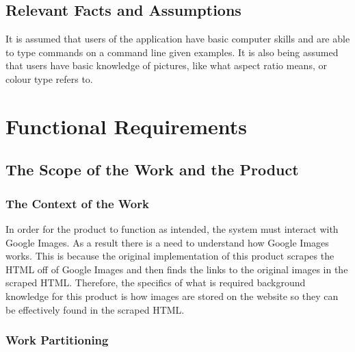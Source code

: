 \documentclass[12pt, titlepage]{article}
\begin{document}
\subsection{Relevant Facts and Assumptions}

It is assumed that users of the application have basic computer skills and are able to type commands on a command line given examples. It is also being assumed that users have basic knowledge of pictures, like what aspect ratio means, or colour type refers to.

\section{Functional Requirements}

\subsection{The Scope of the Work and the Product}

\subsubsection{The Context of the Work}

In order for the product to function as intended, the system must interact with Google Images. As a result there is a need to understand how Google Images works. This is because the original implementation of this product scrapes the HTML off of Google Images and then finds the links to the original images in the scraped HTML. Therefore, the specifics of what is required background knowledge for this product is how images are stored on the website so they can be effectively found in the scraped HTML. 

\subsubsection{Work Partitioning}
\end{document}
